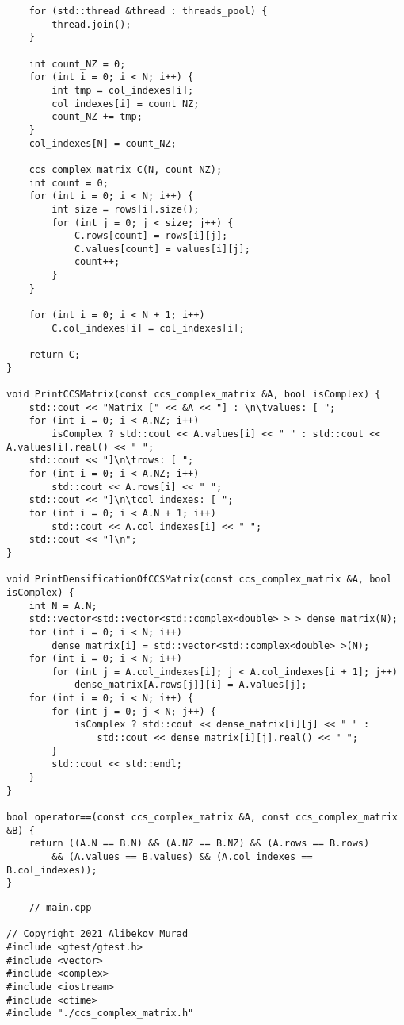 \documentclass{report}
\begin{document}
\begin{itemize}
\begin{itemize}
\begin{lstlisting}
    for (std::thread &thread : threads_pool) {
        thread.join();
    }

    int count_NZ = 0;
    for (int i = 0; i < N; i++) {
        int tmp = col_indexes[i];
        col_indexes[i] = count_NZ;
        count_NZ += tmp;
    }
    col_indexes[N] = count_NZ;

    ccs_complex_matrix C(N, count_NZ);
    int count = 0;
    for (int i = 0; i < N; i++) {
        int size = rows[i].size();
        for (int j = 0; j < size; j++) {
            C.rows[count] = rows[i][j];
            C.values[count] = values[i][j];
            count++;
        }
    }

    for (int i = 0; i < N + 1; i++)
        C.col_indexes[i] = col_indexes[i];

    return C;
}

void PrintCCSMatrix(const ccs_complex_matrix &A, bool isComplex) {
    std::cout << "Matrix [" << &A << "] : \n\tvalues: [ ";
    for (int i = 0; i < A.NZ; i++)
        isComplex ? std::cout << A.values[i] << " " : std::cout << A.values[i].real() << " ";
    std::cout << "]\n\trows: [ ";
    for (int i = 0; i < A.NZ; i++)
        std::cout << A.rows[i] << " ";
    std::cout << "]\n\tcol_indexes: [ ";
    for (int i = 0; i < A.N + 1; i++)
        std::cout << A.col_indexes[i] << " ";
    std::cout << "]\n";
}

void PrintDensificationOfCCSMatrix(const ccs_complex_matrix &A, bool isComplex) {
    int N = A.N;
    std::vector<std::vector<std::complex<double> > > dense_matrix(N);
    for (int i = 0; i < N; i++)
        dense_matrix[i] = std::vector<std::complex<double> >(N);
    for (int i = 0; i < N; i++)
        for (int j = A.col_indexes[i]; j < A.col_indexes[i + 1]; j++)
            dense_matrix[A.rows[j]][i] = A.values[j];
    for (int i = 0; i < N; i++) {
        for (int j = 0; j < N; j++) {
            isComplex ? std::cout << dense_matrix[i][j] << " " :
                std::cout << dense_matrix[i][j].real() << " ";
        }
        std::cout << std::endl;
    }
}

bool operator==(const ccs_complex_matrix &A, const ccs_complex_matrix &B) {
    return ((A.N == B.N) && (A.NZ == B.NZ) && (A.rows == B.rows)
        && (A.values == B.values) && (A.col_indexes == B.col_indexes));
}
	\end{lstlisting}
	\begin{lstlisting}
	// main.cpp

// Copyright 2021 Alibekov Murad
#include <gtest/gtest.h>
#include <vector>
#include <complex>
#include <iostream>
#include <ctime>
#include "./ccs_complex_matrix.h"


\end{lstlisting}
\end{itemize}
\end{itemize}
\end{document}
